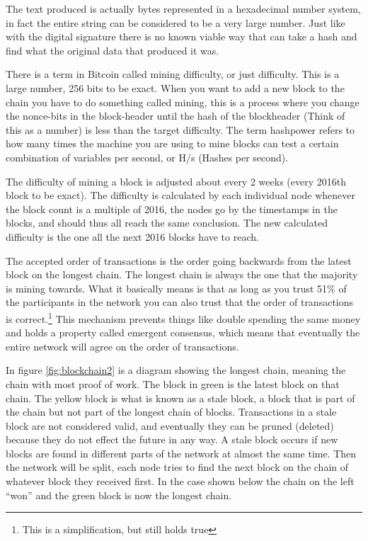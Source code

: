 The text produced is actually bytes represented in a hexadecimal number system,
in fact the entire string can be considered to be a very large number. Just like
with the digital signature there is no known viable way that can take a hash and
find what the original data that produced it was.

There is a term in Bitcoin called mining difficulty, or just difficulty. This
is a large number, 256 bits to be exact. When you want to add a new block to
the chain you have to do something called mining, this is a process where you
change the nonce-bits in the block-header until the hash of the blockheader (Think
of this as a number) is less than the target difficulty. The term hashpower refers
to how many times the machine you are using to mine blocks can test a certain
combination of variables per second, or H/s (Hashes per second).

The difficulty of mining a block is adjusted about every 2 weeks (every 2016th block to be exact). The difficulty
is calculated by each individual node whenever the block count is a multiple of 2016, the nodes go by the timestamps in the blocks, and should thus all reach the same conclusion. The new calculated difficulty is the one all the next 2016 blocks have to reach.\cite{antonopoulos_2017}

The accepted order of transactions is the order going backwards from the latest
block on the longest chain. The longest chain is always the one that the majority
is mining towards. What it basically
means is that as long as you trust 51\% of the participants in the network you
can also trust that the order of transactions is correct.\footnote{This is a simplification, but still holds true} This mechanism
prevents things like double spending the same money and holds a property called
emergent consensus, which means that eventually the entire network will agree
on the order of transactions.

In figure \ref{fig:blockchain2} is a diagram showing the longest chain, meaning
the chain with most proof of work. The block in green is the latest block on
that chain. The yellow block is what is known as a stale block, a block that is
part of the chain but not part of the longest chain of blocks. Transactions in
a stale block are not considered valid, and eventually they can be pruned
(deleted) because they do not effect the future in any way. A stale block occurs
if new blocks are found in different parts of the network at almost the same
time. Then the network will be split, each node tries to find the next block on
the chain of whatever block they received first. In the case shown below the
chain on the left \enquote{won} and the green block is now the longest chain.


